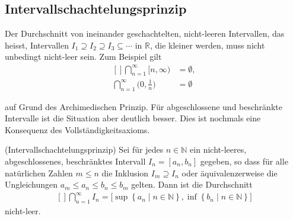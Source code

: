 \documentclass[../Analysis1_script.tex]{subfiles}
\begin{document}
\subsection{Intervallschachtelungsprinzip}

Der Durchschnitt von ineinander geschachtelten, nicht-leeren Intervallen, das heisst, Intervallen $I_1 \supseteq I_2 \supseteq I_3\subseteq \cdots$ in $\mathbb {R}$, die kleiner werden, muss nicht unbedingt nicht-leer sein. Zum Beispiel gilt
\[\begin{aligned}[]
	\bigcap _{n=1}^\infty \big [n,\infty \big ) & = \emptyset , \\ \bigcap _{n=1}^\infty \bigg (0 , \frac {1}{n}\bigg ) & = \emptyset
\end{aligned}\]

auf Grund des Archimedischen Prinzip. Für abgeschlossene und beschränkte Intervalle ist die Situation aber deutlich besser. Dies ist nochmals eine Konsequenz des Vollständig­keitsaxioms.

\begin{proposition}{(Intervallschachtelungsprinzip)}
	Sei für jedes $n \in \mathbb{N}$ ein nicht-leeres, abgeschlossenes, beschränktes Intervall $I_n = [a_n, b_n]$ gegeben, so dass für alle natürlichen Zahlen $m \leq n$ die Inklusion $I_m \supseteq I_n$ oder äquivalenzerweise die Ungleichungen $a_m \leq a_n \leq b_n \leq b_m$ gelten. Dann ist die Durchschnitt
	\[\begin{aligned}[]
		\bigcap _{n=1}^\infty I_n = \big [\sup \left \lbrace {a_n} \mid {n\in \mathbb {N}}\right \rbrace ,\inf \left \lbrace {b_n} \mid {n\in \mathbb {N}}\right \rbrace \big ]
	\end{aligned}\]
	nicht-leer.   
\end{proposition}
\end{document}
